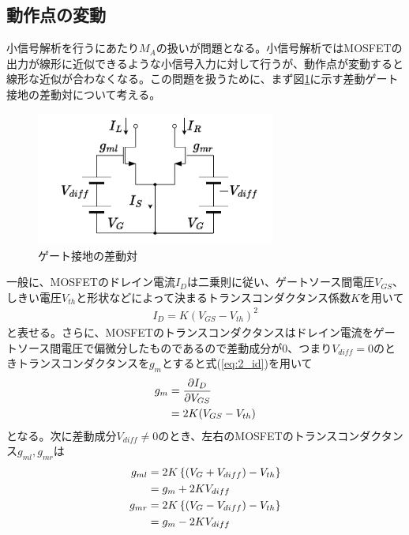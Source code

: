         \subsection{動作点の変動}   \label{ch:gilbert_valiable_gm}
            小信号解析を行うにあたり$M_{A}$の扱いが問題となる。小信号解析ではMOSFETの出力が線形に近似できるような小信号入力に対して行うが、動作点が変動すると線形な近似が合わなくなる。この問題を扱うために、まず図\ref{fig:2_OP}に示す差動ゲート接地の差動対について考える。\par
            \begin{figure}[!b]
                \begin{center}
                    \includegraphics[width=0.7\textwidth]{figures/chapter2/OperatingPoint.pdf}
                    \caption{ゲート接地の差動対}
                    \label{fig:2_OP}
                \end{center}
            \end{figure}
            \clearpage
            一般に、MOSFETのドレイン電流$I_{D}$は二乗則に従い、ゲートソース間電圧$V_{GS}$、しきい電圧$V_{th}$と形状などによって決まるトランスコンダクタンス係数$K$を用いて
            \begin{align}
                I_{D}=K(V_{GS}-V_{th})^{2}  \label{eq:2_id}
            \end{align}
            と表せる。さらに、MOSFETのトランスコンダクタンスはドレイン電流をゲートソース間電圧で偏微分したものであるので差動成分が$0$、つまり$V_{diff}=0$のときトランスコンダクタンスを$g_{m}$とすると式(\ref{eq:2_id})を用いて
            \begin{align}
                g_{m}&=\frac{ \partial I_{D} }{ \partial V_{GS} }   \notag\\
                &=2K(V_{GS}-V_{th})     \label{eq:2_gm}
            \end{align}
            となる。次に差動成分$V_{diff}\neq0$のとき、左右のMOSFETのトランスコンダクタンス$g_{ml},g_{mr}$は
            \begin{align}
                g_{ml}&=2K\left\{ (V_{G}+V_{diff}) -V_{th} \right\}     \notag\\
                &=g_{m}+2KV_{diff}      \notag\\
                g_{mr}&=2K\left\{ (V_{G}-V_{diff}) -V_{th} \right\}     \notag\\
                &=g_{m}-2KV_{diff}      \notag
            \end{align}
